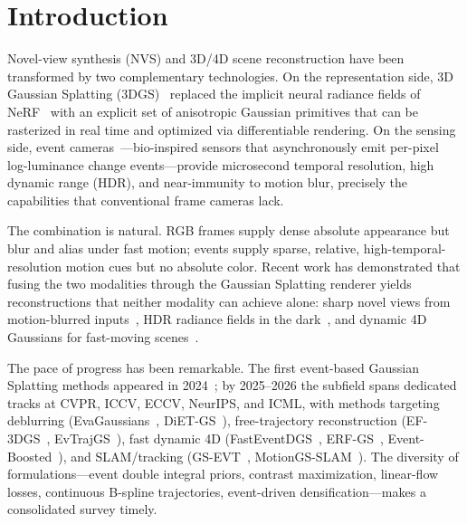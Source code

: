 \section{Introduction}
\label{sec:introduction}

Novel-view synthesis (NVS) and 3D/4D scene reconstruction have been transformed by two complementary technologies. On the representation side, 3D Gaussian Splatting (3DGS)~\cite{kerbl2023gaussian} replaced the implicit neural radiance fields of NeRF~\cite{mildenhall2021nerf} with an explicit set of anisotropic Gaussian primitives that can be rasterized in real time and optimized via differentiable rendering. On the sensing side, event cameras~\cite{gallego2020event}---bio-inspired sensors that asynchronously emit per-pixel log-luminance change events---provide microsecond temporal resolution, high dynamic range (HDR), and near-immunity to motion blur, precisely the capabilities that conventional frame cameras lack.

The combination is natural. RGB frames supply dense absolute appearance but blur and alias under fast motion; events supply sparse, relative, high-temporal-resolution motion cues but no absolute color. Recent work has demonstrated that fusing the two modalities through the Gaussian Splatting renderer yields reconstructions that neither modality can achieve alone: sharp novel views from motion-blurred inputs~\cite{yu2025evagaussians,lee2025dietgs}, HDR radiance fields in the dark~\cite{wu2025darkevgs,chen2026evhdrgs}, and dynamic 4D Gaussians for fast-moving scenes~\cite{dai2026fasteventdgs,bai2026erfgs,xu2025eventboosted}.

The pace of progress has been remarkable. The first event-based Gaussian Splatting methods appeared in 2024~\cite{han2024event3dgs,deguchi2024e2gs,wang2024evggs}; by 2025--2026 the subfield spans dedicated tracks at CVPR, ICCV, ECCV, NeurIPS, and ICML, with methods targeting deblurring (EvaGaussians~\cite{yu2025evagaussians}, DiET-GS~\cite{lee2025dietgs}), free-trajectory reconstruction (EF-3DGS~\cite{liao2025ef3dgs}, EvTrajGS~\cite{chen2026evtrajgs}), fast dynamic 4D (FastEventDGS~\cite{dai2026fasteventdgs}, ERF-GS~\cite{bai2026erfgs}, Event-Boosted~\cite{xu2025eventboosted}), and SLAM/tracking (GS-EVT~\cite{liu2025gsevt}, MotionGS-SLAM~\cite{hu2026motiongs}). The diversity of formulations---event double integral priors, contrast maximization, linear-flow losses, continuous B-spline trajectories, event-driven densification---makes a consolidated survey timely.

